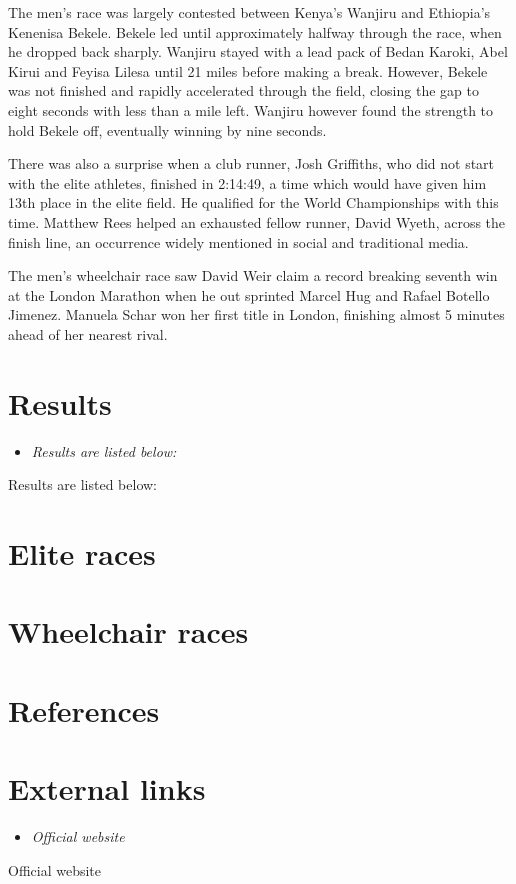 The men's race was largely contested between Kenya's Wanjiru and
Ethiopia's Kenenisa Bekele. Bekele led until approximately halfway
through the race, when he dropped back sharply. Wanjiru stayed with a
lead pack of Bedan Karoki, Abel Kirui and Feyisa Lilesa until 21 miles
before making a break. However, Bekele was not finished and rapidly
accelerated through the field, closing the gap to eight seconds with
less than a mile left. Wanjiru however found the strength to hold Bekele
off, eventually winning by nine seconds.

There was also a surprise when a club runner, Josh Griffiths, who did
not start with the elite athletes, finished in 2:14:49, a time which
would have given him 13th place in the elite field. He qualified for the
World Championships with this time. Matthew Rees helped an exhausted
fellow runner, David Wyeth, across the finish line, an occurrence widely
mentioned in social and traditional media.

The men's wheelchair race saw David Weir claim a record breaking seventh
win at the London Marathon when he out sprinted Marcel Hug and Rafael
Botello Jimenez. Manuela Schar won her first title in London, finishing
almost 5 minutes ahead of her nearest rival.

\section{Results}\label{results}

\begin{itemize}
\item
  \emph{Results are listed below:}
\end{itemize}

Results are listed below:

\section{Elite races}\label{elite-races}

\section{Wheelchair races}\label{wheelchair-races}

\section{References}\label{references}

\section{External links}\label{external-links}

\begin{itemize}
\item
  \emph{Official website}
\end{itemize}

Official website
